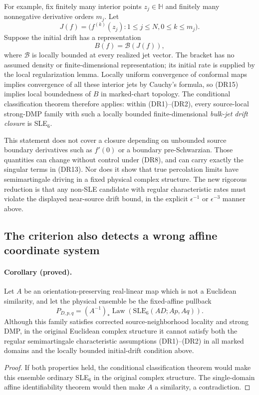 \documentclass[11pt]{article}
\theoremstyle{definition}\newtheorem{definition}[theorem]{Definition}
\theoremstyle{remark}\newtheorem{remark}[theorem]{Remark}
\begin{document}
For example, fix finitely many interior points $z_j\in\mathbb H$ and
finitely many nonnegative derivative orders $m_j$.  Let
\[
 J(f)=\bigl(f^{(k)}(z_j):1\leq j\leq N,
                              0\leq k\leq m_j\bigr).
\]
Suppose the initial drift has a representation
\[
 B(f)=\mathcal B(J(f)),
 \tag{DR15}
\]
where $\mathcal B$ is locally bounded at every realized jet vector.
The bracket has no assumed density or finite-dimensional representation;
its initial rate is supplied by the local regularization lemma.
Locally uniform convergence of conformal maps implies convergence of all
these interior jets by Cauchy's formula, so (DR15) implies local boundedness
of $B$ in marked-chart topology.  The conditional classification theorem
therefore applies: within (DR1)--(DR2), every source-local strong-DMP family
with such a locally bounded finite-dimensional \emph{bulk-jet drift closure}
is SLE$_6$.

This statement does not cover a closure depending on unbounded source
boundary derivatives such as $f'(0)$ or a boundary pre-Schwarzian.  Those
quantities can change without control under (DR8), and can carry exactly the
singular terms in (DR13).  Nor does it show that true percolation limits have
semimartingale driving in a fixed physical complex structure.  The new
rigorous reduction is that any non-SLE candidate with regular characteristic
rates must violate the displayed near-source drift bound, in the explicit
$\epsilon^{-1}$ or $\epsilon^{-3}$ manner above.


\subsection{The criterion also detects a wrong affine coordinate system}

\paragraph{Corollary (proved).}
Let $A$ be an orientation-preserving real-linear map which is not a Euclidean
similarity, and let the physical ensemble be the fixed-affine pullback
\[
 P_{D,p,q}=(A^{-1})_*
       \operatorname{Law}(\mathrm{SLE}_6(AD;Ap,Aq)).
\]
Although this family satisfies corrected source-neighborhood locality and
strong DMP, in the original Euclidean complex structure it cannot satisfy
both the regular semimartingale characteristic assumptions (DR1)--(DR2) in
all marked domains and the locally bounded initial-drift condition above.

\begin{proof}
If both properties held, the conditional classification theorem would make
this ensemble ordinary SLE$_6$ in the original complex structure.  The
single-domain affine identifiability theorem would then make $A$ a
similarity, a contradiction.
\end{proof}
\end{document}
